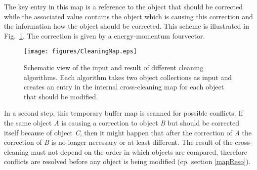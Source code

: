 \documentclass{cmspaper}
\begin{document}
The key entry in this map is a reference to the object that should be corrected
while the associated value contains the object which is causing this correction
and the information how the object should be corrected. This scheme is
illustrated in Fig.~\ref{fig:Cleaning}. The correction is given by a
energy-momentum fourvector.

\begin{figure}[hbt]
\begin{center}
\texttt{[image: figures/CleaningMap.eps]}
\caption{Schematic view of the input and result of different cleaning
    algorithms. Each algorithm takes two object collections as input and
    creates an entry in the internal cross-cleaning map for each object
    that should be modified.}
\label{fig:Cleaning}
\end{center}
\end{figure}

In a second step, this temporary buffer map is scanned for possible conflicts.
If the same object {\it A} is causing a correction to object {\it B} but should
be corrected itself because of object {\it C}, then it might happen that after
the correction of {\it A} the correction of {\it B} is no longer necessary or at
least different.
The result of the cross-cleaning must not depend on the order in which objects
are compared, therefore conflicts are resolved before any object is being
modified (cp. section \ref{mapReso}).

%
\end{document}
